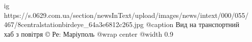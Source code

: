  
 
 
 
 

\ifcmt
  ig https://s.0629.com.ua/section/newsInText/upload/images/news/intext/000/055/467/8centralstationbirdeye_64a3e6812c265.jpg
	@caption Вид на транспортний хаб з повітря © Ре: Маріуполь
  @wrap center
  @width 0.9
\fi
